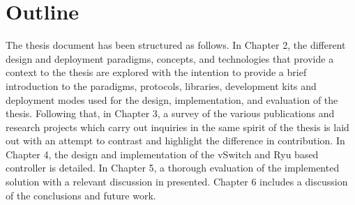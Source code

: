 \section{Outline}
The thesis document has been structured as follows. In Chapter 2, the different design and deployment paradigms, concepts, and technologies that provide a context to the thesis are explored with the intention to provide a brief introduction to the paradigms, protocols, libraries, development kits and deployment modes used for the design, implementation, and evaluation of the thesis. Following that, in Chapter 3, a survey of the various publications and research projects which carry out inquiries in the same spirit of the thesis is laid out with an attempt to contrast and highlight the difference in contribution. In Chapter 4, the design and implementation of the vSwitch and Ryu based controller is detailed. In Chapter 5, a thorough evaluation of the implemented solution with a relevant discussion in presented. Chapter 6 includes a discussion of the conclusions and future work.





